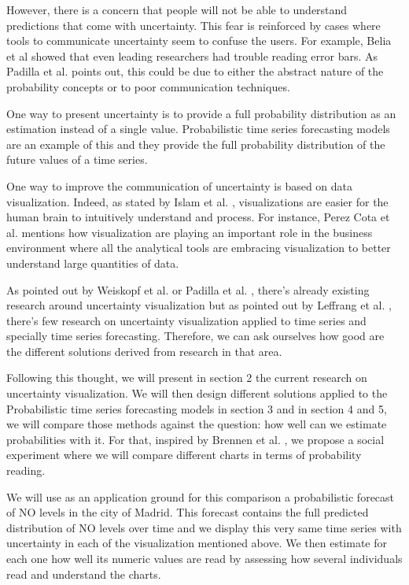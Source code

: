 \documentclass[a4paper,3p,sort&compress]{elsarticle}
\begin{document}
However, there is a concern that people will not be able to understand predictions that come with uncertainty.
This fear is reinforced by cases where tools to communicate uncertainty seem to confuse the users. For example,
Belia et al \cite{belia_researchers_2005} showed that even leading researchers had 
trouble reading error bars. 
As Padilla et al. \cite{padilla_uncertainty_2021} 
points out, this could be due to either the abstract nature of the probability concepts or to poor communication techniques.

One way to present 
uncertainty is to provide a full probability distribution as an estimation instead of a single value. 
Probabilistic time series forecasting models are an example of this and they provide the full probability 
distribution of the future values of a time series.

One way to improve the communication of uncertainty is based on data visualization. Indeed, as 
stated by Islam et al. \cite{islam_overview_2019}, visualizations are easier for the human brain to intuitively understand and process.
For instance, Perez Cota et al. \cite{cota_importance_2014} mentions how visualization are playing an important role in the business 
environment where all the analytical tools are embracing visualization to better understand large quantities of data. 

As pointed out by Weiskopf et al. \cite{weiskopf_uncertainty_2022} or Padilla et al. \cite{padilla_uncertainty_2021}, 
there's already existing research around uncertainty visualization 
but as pointed out by Leffrang et al. \cite{leffrang_should_2021}, there's few research on uncertainty visualization applied to time series 
and specially time series forecasting. Therefore, we can ask ourselves how good are the different solutions derived from research in that area. 

Following this thought, we will present in section 2 the current research on uncertainty visualization. We will then
design different solutions applied to the Probabilistic time series forecasting models in section 3 and in section 4 and 5,
we will compare those methods against the question: how well can we estimate probabilities with it. 
For that, inspired by Brennen et al. \cite{brennen_instrument_2018}, we propose a social experiment where we will compare different charts 
in terms of probability reading. 

We will use as an application ground for this comparison a probabilistic forecast of NO levels 
in the city of Madrid. This forecast contains the full predicted distribution of NO levels over time
and we display this very same time series with uncertainty in each of the visualization mentioned above. 
We then estimate for each one how well its numeric values are read by assessing how several individuals read 
and understand the charts.
\end{document}
